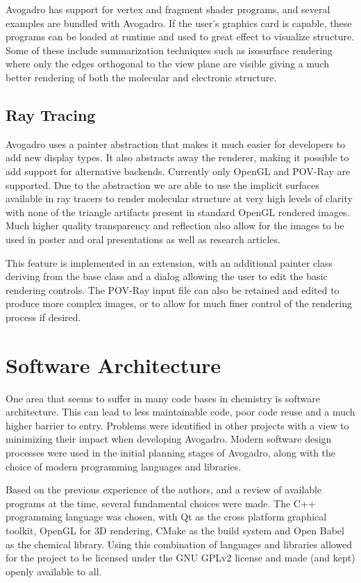 \documentclass[10pt]{bmc_article}
\newenvironment{bmcformat}{\begin{raggedright}
\baselineskip20pt\sloppy\setboolean{publ}{false}}{\end{raggedright}
\baselineskip20pt\sloppy}
\begin{document}
\begin{bmcformat}
Avogadro has support for vertex and fragment shader programs, and several
examples are bundled with Avogadro. If the user's graphics card is capable,
these programs can be loaded at runtime and used to great effect to visualize
structure. Some of these include summarization techniques such as isosurface
rendering where only the edges orthogonal to the view plane are visible giving
a much better rendering of both the molecular and electronic structure.

\subsection{Ray Tracing}

Avogadro uses a painter abstraction that makes it much easier for developers to
add new display types. It also abstracts away the renderer, making it possible
to add support for alternative backends. Currently only OpenGL and POV-Ray are
supported. Due to the abstraction we are able to use the implicit surfaces
available in ray tracers to render molecular structure at very high levels of
clarity with none of the triangle artifacts present in standard OpenGL rendered
images. Much higher quality transparency and reflection also allow for the
images to be used in poster and oral presentations as well as research
articles.

This feature is implemented in an extension, with an additional painter class
deriving from the base class and a dialog allowing the user to edit the basic
rendering controls. The POV-Ray input file can also be retained and edited to
produce more complex images, or to allow for much finer control of the
rendering process if desired.

\section{Software Architecture}

One area that seems to suffer in many code bases in chemistry is software
architecture. This can lead to less maintainable code, poor code reuse and a
much higher barrier to entry. Problems were identified in other projects with a
view to minimizing their impact when developing Avogadro. Modern software design
processes were used in the initial planning stages of Avogadro, along with the
choice of modern programming languages and libraries.

Based on the previous experience of the authors, and a review of available
programs at the time, several fundamental choices were made. The C++ programming
language was chosen, with Qt as the cross platform graphical toolkit, OpenGL for
3D rendering, CMake as the build system and Open Babel as the chemical library.
Using this combination of languages and libraries allowed for the project to be
licensed under the GNU GPLv2 license and made (and kept) openly available to
all.


\end{bmcformat}
\end{document}

